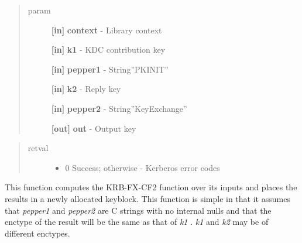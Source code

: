 \documentclass[letterpaper,10pt,english]{sphinxmanual}
\begin{document}
\begin{fulllineitems}
\label{appdev/refs/api/krb5_c_fx_cf2_simple:krb5_c_fx_cf2_simple}
\end{fulllineitems}

\begin{quote}\begin{description}
\item[{param}] \leavevmode
\textbf{{[}in{]}} \textbf{context} - Library context

\textbf{{[}in{]}} \textbf{k1} - KDC contribution key

\textbf{{[}in{]}} \textbf{pepper1} - String''PKINIT''

\textbf{{[}in{]}} \textbf{k2} - Reply key

\textbf{{[}in{]}} \textbf{pepper2} - String''KeyExchange''

\textbf{{[}out{]}} \textbf{out} - Output key

\end{description}\end{quote}
\begin{quote}\begin{description}
\item[{retval}] \leavevmode\begin{itemize}
\item {} 
0   Success; otherwise - Kerberos error codes

\end{itemize}

\end{description}\end{quote}

This function computes the KRB-FX-CF2 function over its inputs and places the results in a newly allocated keyblock. This function is simple in that it assumes that \emph{pepper1} and \emph{pepper2} are C strings with no internal nulls and that the enctype of the result will be the same as that of \emph{k1} . \emph{k1} and \emph{k2} may be of different enctypes.
\end{document}
